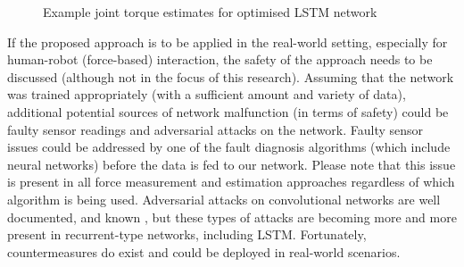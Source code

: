 \begin{figure}
    \centering
    \hfill
    \caption{Example joint torque estimates for optimised LSTM network}
    \label{fig:JointTorqueOptim}
\end{figure}

If the proposed approach is to be applied in the real-world setting, especially for human-robot (force-based) interaction, the safety of the approach needs to be discussed (although not in the focus of this research). Assuming that the network was trained appropriately (with a sufficient amount and variety of data), additional potential sources of network malfunction (in terms of safety) could be faulty sensor readings and adversarial attacks on the network. Faulty sensor issues could be addressed by one of the fault diagnosis algorithms \cite{Li2020} (which include neural networks) before the data is fed to our network. Please note that this issue is present in all force measurement and estimation approaches regardless of which algorithm is being used. Adversarial attacks on convolutional networks are well documented, and known \cite{Heaven2019}, but these types of attacks are becoming more and more present in recurrent-type networks, including LSTM. Fortunately, countermeasures do exist \cite{Rosenberg2019} and could be deployed in real-world scenarios.

